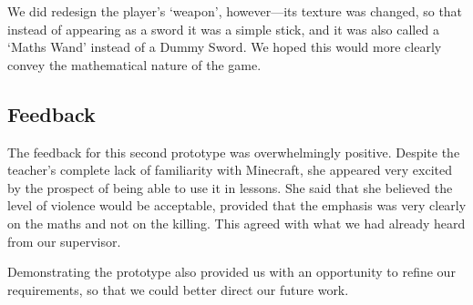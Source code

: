 We did redesign the player's `weapon', however---its texture was changed,
so that instead of appearing as a sword it was a simple stick, and it was
also called a `Maths Wand' instead of a Dummy Sword. We hoped this would
more clearly convey the mathematical nature of the game.

\subsection{Feedback}
The feedback for this second prototype was overwhelmingly positive. Despite
the teacher's complete lack of familiarity with Minecraft, she appeared
very excited by the prospect of being able to use it in lessons. She said
that she believed the level of violence would be acceptable, provided that
the emphasis was very clearly on the maths and not on the killing. This agreed
with what we had already heard from our supervisor.

Demonstrating the prototype also provided us with an opportunity to refine
our requirements, so that we could better direct our future work.
